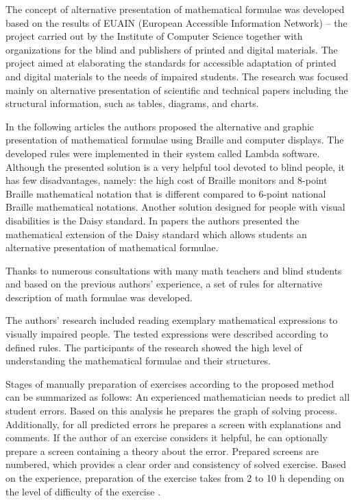 \documentclass[12pt,1p]{elsarticle}
\begin{document}
	The concept of alternative presentation of mathematical formulae was developed based on the results of EUAIN (European Accessible Information Network) – the project carried out by the Institute of Computer Science together with organizations for the blind and publishers of printed and digital materials. The project aimed at elaborating the standards for accessible adaptation of printed and digital materials to the needs of impaired students. The research was focused mainly on alternative presentation of scientific and technical papers including the structural information, such as tables, diagrams, and charts.
	
	In the following articles \cite{Bernareggi:2010, Nicotra:2010} the authors proposed the alternative and graphic presentation of mathematical formulae using Braille and computer displays. The developed rules were implemented in their system called Lambda software. Although the presented solution is a very helpful tool devoted to blind people, it has few disadvantages, namely: the high cost of Braille monitors and 8-point Braille mathematical notation that is different compared to 6-point national Braille mathematical notations. Another solution designed for people with visual disabilities is the Daisy standard. In papers \cite{Gardner:2012, Brzoza:2006, Brzoza:2008, Fitzpatrick:2006} the authors presented the mathematical extension of the Daisy standard which allows students an alternative presentation of mathematical formulae.
	
	Thanks to numerous consultations with many math teachers and blind students and based on the previous authors' experience, a set of rules for alternative description of math formulae was developed.
	
	The authors' research included reading exemplary mathematical expressions to visually impaired people. The tested expressions were described according to defined rules. The participants of the research showed the high level of understanding the mathematical formulae and their structures.
	
	Stages of manually preparation of exercises according to the proposed method can be summarized as follows: An experienced mathematician needs to predict all student errors. Based on this analysis he prepares the graph of solving process. Additionally, for all predicted errors he prepares a screen with explanations and comments. If the author of an exercise considers it helpful, he can optionally prepare a screen containing a theory about the error. Prepared screens are numbered, which provides a clear order and consistency of solved exercise. Based on the experience, preparation of the exercise takes from 2 to 10 h depending on the level of difficulty of the exercise \cite{Brzoza:2012}.
	
\end{document}

